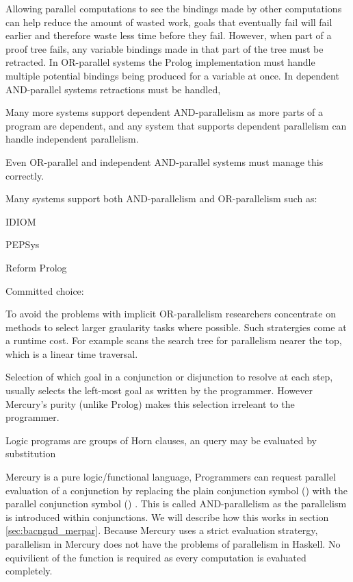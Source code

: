 Allowing parallel computations to see the bindings made by other
computations can help reduce the amount of wasted work,
goals that eventually fail will fail earlier and therefore waste less time
before they fail.
However, when part of a proof tree fails, any variable bindings made in that
part of the tree must be retracted.
In OR-parallel systems the Prolog implementation must handle multiple
potential bindings being produced for a variable at once.
In dependent AND-parallel systems retractions must be handled, 

Many more systems support dependent AND-parallelism as more parts of a
program are dependent,
and any system that supports dependent parallelism can handle independent
parallelism.



Even
OR-parallel and independent AND-parallel systems must manage this correctly.

Many systems support both AND-parallelism and OR-parallelism such as:

IDIOM

PEPSys

Reform Prolog

Committed choice:






To avoid the problems with implicit OR-parallelism researchers concentrate
on methods to select larger graularity tasks where possible.
Such stratergies come at a runtime cost.
For example \citet{hausman:1987:or} scans the search tree for parallelism
nearer the top, which is a linear time traversal.

Selection of which goal in a conjunction or disjunction to resolve at each
step,
usually selects the left-most goal as written by the programmer.
However Mercury's purity (unlike Prolog) makes this selection irreleant to
the programmer.


Logic programs are groups of Horn clauses,
an query may be evaluated by substitution  




\label{ref:parallel_conjunction}
Mercury is a pure logic/functional language,
Programmers can request parallel evaluation of a conjunction by replacing
the plain conjunction symbol (\samp{,})
with the parallel conjunction symbol (\samp{\&})
\citep{conway:2002:par,wang:2006:hons,wang:2011:dep-par}.
This is called AND-parallelism as the parallelism is introduced within
conjunctions.
We will describe how this works in section \ref{sec:bacngnd_merpar}.
Because Mercury uses a strict evaluation stratergy,
parallelism in Mercury does not have the problems of parallelism in Haskell.
No equivilient of the  function is required as every computation
is evaluated completely.


